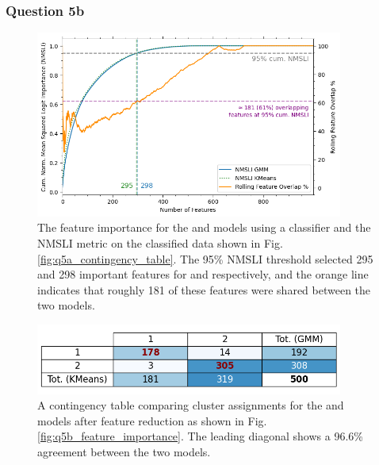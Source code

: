 \subsubsection{Question 5b}\label{subsubsec:q5b}
    \begin{figure}[htb]
    \centering
    \includegraphics[width=0.9\textwidth]{./figures/q5b_feature_importance}
    \caption{The feature importance for the  and  models using a 
        classifier and the NMSLI metric on the classified data shown in Fig. \eqref{fig:q5a_contingency_table}.
        The 95\% NMSLI threshold selected 295 and 298 important features for  and  respectively, and the
        orange line indicates that roughly 181 of these features were shared between the two models.}
    \label{fig:q5b_feature_importance}
    \end{figure}

    \begin{figure}[htb]
    \centering
    \includegraphics[width=0.9\textwidth]{./figures/q5b_contingency_table}
    \caption{A contingency table comparing cluster assignments for the  and  models after feature
        reduction as shown in Fig. \eqref{fig:q5b_feature_importance}. The leading diagonal shows a 96.6\% agreement
        between the two models.}
    \label{fig:q5b_contingency_table}
    \end{figure}

